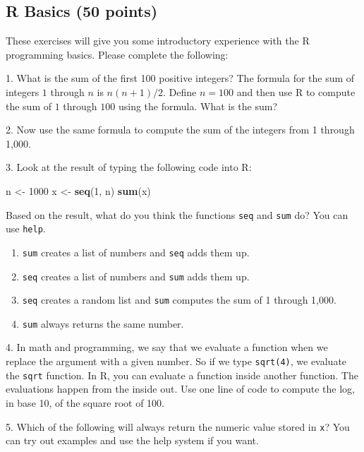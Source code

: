 \documentclass[
]{article}
\newenvironment{Shaded}{\begin{snugshade}}{\end{snugshade}}
\newcommand{\DecValTok}[1]{\textcolor[rgb]{0.00,0.00,0.81}{#1}}
\newcommand{\FunctionTok}[1]{\textcolor[rgb]{0.13,0.29,0.53}{\textbf{#1}}}
\newcommand{\NormalTok}[1]{#1}
\newcommand{\OtherTok}[1]{\textcolor[rgb]{0.56,0.35,0.01}{#1}}
\providecommand{\tightlist}{%
  \setlength{\itemsep}{0pt}\setlength{\parskip}{0pt}}
\begin{document}
\subsection*{R Basics (50 points)}

These exercises will give you some introductory experience with the R
programming basics. Please complete the following:

1. What is the sum of the first 100 positive integers? The formula for
the sum of integers \(1\) through \(n\) is \(n(n+1)/2\). Define
\(n=100\) and then use R to compute the sum of \(1\) through \(100\)
using the formula. What is the sum?

2. Now use the same formula to compute the sum of the integers from 1
through 1,000.

3. Look at the result of typing the following code into R:

\begin{Shaded}
\begin{Highlighting}[]
\NormalTok{n }\OtherTok{\textless{}{-}} \DecValTok{1000}
\NormalTok{x }\OtherTok{\textless{}{-}} \FunctionTok{seq}\NormalTok{(}\DecValTok{1}\NormalTok{, n)}
\FunctionTok{sum}\NormalTok{(x)}
\end{Highlighting}
\end{Shaded}

Based on the result, what do you think the functions \texttt{seq} and
\texttt{sum} do? You can use \texttt{help}.

\begin{enumerate}
\def\labelenumi{\alph{enumi}.}
\tightlist
\item
  \texttt{sum} creates a list of numbers and \texttt{seq} adds them up.
\item
  \texttt{seq} creates a list of numbers and \texttt{sum} adds them up.
\item
  \texttt{seq} creates a random list and \texttt{sum} computes the sum
  of 1 through 1,000.
\item
  \texttt{sum} always returns the same number.
\end{enumerate}

4. In math and programming, we say that we evaluate a function when we
replace the argument with a given number. So if we type
\texttt{sqrt(4)}, we evaluate the \texttt{sqrt} function. In R, you can
evaluate a function inside another function. The evaluations happen from
the inside out. Use one line of code to compute the log, in base 10, of
the square root of 100.

5. Which of the following will always return the numeric value stored in
\texttt{x}? You can try out examples and use the help system if you
want.
\end{document}
